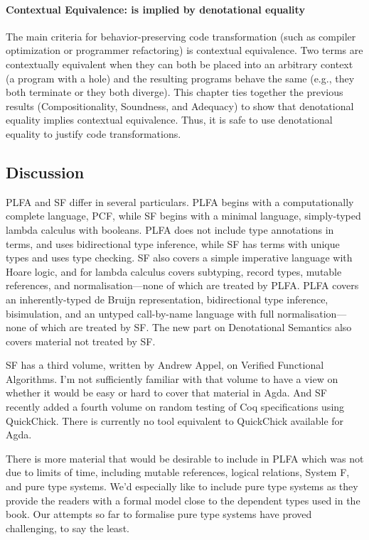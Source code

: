 \documentclass[preprint,authoryear]{elsarticle}
\begin{document}
\paragraph{Contextual Equivalence: is implied by denotational equality}
The main criteria for behavior-preserving code transformation (such as
compiler optimization or programmer refactoring) is contextual
equivalence. Two terms are contextually equivalent when they can both
be placed into an arbitrary context (a program with a hole) and the
resulting programs behave the same (e.g., they both terminate or they
both diverge). This chapter ties together the previous results
(Compositionality, Soundness, and Adequacy) to show that denotational
equality implies contextual equivalence. Thus, it is safe to use
denotational equality to justify code transformations.


\subsection*{Discussion}

PLFA and SF differ in several particulars.  PLFA begins with a computationally
complete language, PCF, while SF begins with a minimal language, simply-typed
lambda calculus with booleans.  PLFA does not include type annotations in terms,
and uses bidirectional type inference, while SF has terms with unique types and
uses type checking.  SF also covers a simple imperative language with Hoare
logic, and for lambda calculus covers subtyping, record types, mutable
references, and normalisation---none of which are treated by PLFA.  PLFA covers
an inherently-typed de Bruijn representation, bidirectional type inference,
bisimulation, and an untyped call-by-name language with full
normalisation---none of which are treated by SF.  The new part on
Denotational Semantics also covers material not treated by SF.

SF has a third volume, written by Andrew Appel, on Verified Functional
Algorithms. I'm not sufficiently familiar with that volume to have a view on
whether it would be easy or hard to cover that material in Agda. And SF recently
added a fourth volume on random testing of Coq specifications using QuickChick.
There is currently no tool equivalent to QuickChick available for Agda.

There is more material that would be desirable to include in PLFA which was not
due to limits of time, including mutable references, logical relations, System F, and
pure type systems. We'd especially like to include pure type systems as they
provide the readers with a formal model close to the dependent types used in the
book.  Our attempts so far to formalise pure type systems have proved
challenging, to say the least.
\end{document}
